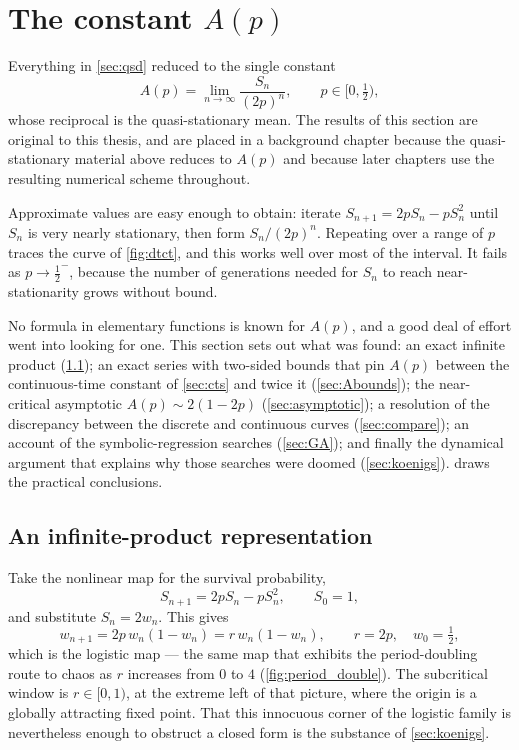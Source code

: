 \section{The constant \texorpdfstring{$A(p)$}{A(p)}}
\label{sec:Ap}

Everything in \cref{sec:qsd} reduced to the single constant
\begin{equation}
\label{eq:Apdef}
A(p) = \lim_{n\to\infty}\frac{S_n}{(2p)^n},
\qquad p\in[0,\tfrac12),
\end{equation}
whose reciprocal is the quasi-stationary mean. The results of this section are
original to this thesis, and are placed in a background chapter because the
quasi-stationary material above reduces to $A(p)$ and because later chapters use
the resulting numerical scheme throughout.

Approximate values are easy enough to obtain: iterate $S_{n+1}=2pS_n-pS_n^2$ until
$S_n$ is very nearly stationary, then form $S_n/(2p)^n$. Repeating over a range of
$p$ traces the curve of \cref{fig:dtct}, and this works well over most of the
interval. It fails as $p\to\tfrac12^-$, because the number of generations needed
for $S_n$ to reach near-stationarity grows without bound.

No formula in elementary functions is known for $A(p)$, and a good deal of effort
went into looking for one. This section sets out what was found: an exact infinite
product (\cref{sec:product}); an exact series with two-sided bounds that pin $A(p)$
between the continuous-time constant of \cref{sec:cts} and twice it
(\cref{sec:Abounds}); the near-critical asymptotic $A(p)\sim2(1-2p)$
(\cref{sec:asymptotic}); a resolution of the discrepancy between the discrete and
continuous curves (\cref{sec:compare}); an account of the symbolic-regression
searches (\cref{sec:GA}); and finally the dynamical argument that explains why
those searches were doomed (\cref{sec:koenigs}).  draws the
practical conclusions.

\subsection{An infinite-product representation}
\label{sec:product}

Take the nonlinear map for the survival probability,
\begin{equation*}
S_{n+1} = 2pS_n - pS_n^2,\qquad S_0=1,
\end{equation*}
and substitute $S_n = 2w_n$. This gives
\begin{equation}
\label{eq:logistic}
w_{n+1} = 2p\,w_n(1-w_n) = r\,w_n(1-w_n),
\qquad r = 2p,\quad w_0 = \tfrac12 ,
\end{equation}
which is the logistic map --- the same map that exhibits the period-doubling route
to chaos as $r$ increases from $0$ to $4$ (\cref{fig:period_double}). The
subcritical window is $r\in[0,1)$, at the extreme left of that picture, where the
origin is a globally attracting fixed point. That this innocuous corner of the
logistic family is nevertheless enough to obstruct a closed form is the substance
of \cref{sec:koenigs}.

